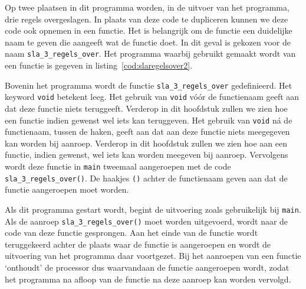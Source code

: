 
Op twee plaatsen in dit programma worden, in de uitvoer van het programma, drie regels overgeslagen.
In plaats van deze code te dupliceren kunnen we deze code ook opnemen in een functie.
Het is belangrijk om de functie een duidelijke naam te geven die aangeeft wat de functie doet.
In dit geval is gekozen voor de naam \texttt{sla\_3\_regels\_over}.
Het programma waarbij gebruikt gemaakt wordt van een functie is gegeven in listing~\ref{cod:slaregelsover2}.


Bovenin het programma wordt de functie \texttt{sla\_3\_regels\_over} gedefinieerd.
Het keyword \texttt{void} betekent leeg.
Het gebruik van \texttt{void} vóór de functienaam geeft aan dat deze functie niets teruggeeft.
Verderop in dit hoofdstuk zullen we zien hoe een functie indien gewenst wel iets kan teruggeven.
Het gebruik van \texttt{void} n\'a de functienaam, tussen de haken, geeft aan dat aan deze functie niets meegegeven kan worden bij aanroep. 
Verderop in dit hoofdstuk zullen we zien hoe aan een functie, indien gewenst, wel iets kan worden meegeven bij aanroep.
Vervolgens wordt deze functie in \texttt{main} tweemaal aangeroepen met de code \texttt{sla\_3\_regels\_over()}.
De haakjes \texttt{()} achter de functienaam geven aan dat de functie aangeroepen moet worden.
 
Als dit programma gestart wordt, begint de uitvoering zoals gebruikelijk bij \texttt{main}.
Als de aanroep \texttt{sla\_3\_regels\_over()} moet worden uitgevoerd, wordt naar de code van deze functie gesprongen.
Aan het einde van de functie wordt teruggekeerd achter de plaats waar de functie is aangeroepen en wordt de uitvoering van het programma daar voortgezet.
Bij het aanroepen van een functie `onthoudt' de processor dus waarvandaan de functie aangeroepen wordt, zodat het programma na afloop van de functie na deze aanroep kan worden vervolgd.

